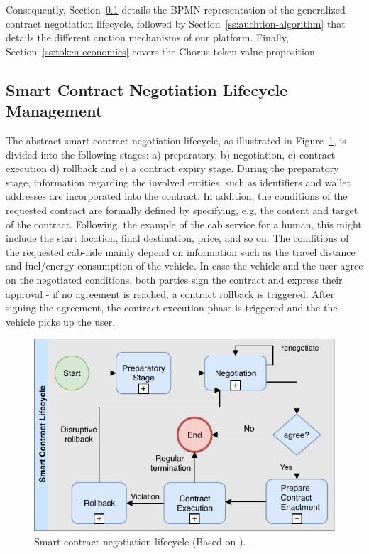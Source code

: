 \documentclass{llncs}
\begin{document}
{		Consequently, Section~\ref{ss:smart-contract-lifecycle-management} details the BPMN representation of the generalized contract negotiation lifecycle, followed by Section~\ref{ss:auchtion-algorithm} that details the different auction mechanisms of our platform. Finally, Section~\ref{ss:token-economics} covers the Chorus token value proposition.



		
		\subsection{Smart Contract Negotiation Lifecycle Management}
			\label{ss:smart-contract-lifecycle-management}
			
			The abstract smart contract negotiation lifecycle, as illustrated in Figure~\ref{fig:smart-contract-lifecycle-management}, is divided into the following stages: a) preparatory, b) negotiation, c) contract execution d) rollback and e) a contract expiry stage. During the preparatory stage, information regarding the involved entities, such as identifiers and wallet addresses are incorporated into the contract. In addition, the conditions of the requested contract are formally defined by specifying, e.g, the content and target of the contract. Following, the example of the cab service for a human, this might include the start location, final destination, price, and so on. The conditions of the requested cab-ride mainly depend on information such as the travel distance and fuel/energy consumption of the vehicle. In case the vehicle and the user agree on the negotiated conditions, both parties sign the contract and express their approval - if no agreement is reached, a contract rollback is triggered. After signing the agreement, the contract execution phase is triggered and the the vehicle picks up the user. 

			\begin{figure}[H]
				\centering
				\includegraphics[scale=0.65]{Figures/smart-contract-lifecycle/20180504_smart-contract-lilfefycle.pdf}
				\caption{Smart contract negotiation lifecycle (Based on \cite{qtumWhitepaper}).}	
				\label{fig:smart-contract-lifecycle-management}
			\end{figure}			

}
\end{document}
